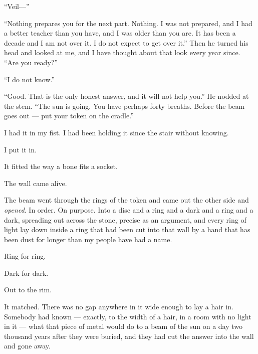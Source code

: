 ``Veil---''\par

``Nothing prepares you for the next part. Nothing. I was not prepared, and I had a better teacher than you have, and I was older than you are. It has been a decade and I am not over it. I do not expect to get over it.'' Then he turned his head and looked at me, and I have thought about that look every year since. ``Are you ready?''\par

``I do not know.''\par

``Good. That is the only honest answer, and it will not help you.'' He nodded at the stem. ``The sun is going. You have perhaps forty breaths. Before the beam goes out --- put your token on the cradle.''\par

I had it in my fist. I had been holding it since the stair without knowing.\par

I put it in.\par

It fitted the way a bone fits a socket.\par

\ornament

The wall came alive.\par

The beam went through the rings of the token and came out the other side and \textit{opened}. In order. On purpose. Into a disc and a ring and a dark and a ring and a dark, spreading out across the stone, precise as an argument, and every ring of light lay down inside a ring that had been cut into that wall by a hand that has been dust for longer than my people have had a name.\par

Ring for ring.\par

Dark for dark.\par

Out to the rim.\par

It matched. There was no gap anywhere in it wide enough to lay a hair in. Somebody had known --- exactly, to the width of a hair, in a room with no light in it --- what that piece of metal would do to a beam of the sun on a day two thousand years after they were buried, and they had cut the answer into the wall and gone away.\par

